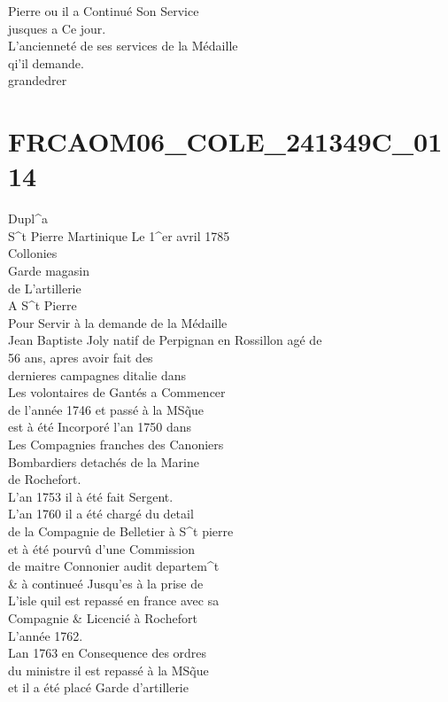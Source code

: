 \documentclass{article}
\begin{document}
\begin{pages}
Pierre ou il a Continué Son Service\\
jusques a Ce jour.\\
L'ancienneté de ses services de la Médaille\\
qi'il demande.\\
grandedrer
\pend
\endnumbering\beginnumbering\section{FRCAOM06\_COLE\_241349C\_0114}\pstart
Dupl\^{}a\\
S\^{}t Pierre Martinique Le 1\^{}er avril 1785\\
Collonies\\
Garde magasin\\
de L'artillerie\\
A S\^{}t Pierre\\
Pour Servir à la demande de la Médaille\\
Jean Baptiste Joly natif de
\pend\pstart
Perpignan en Rossillon agé de\\
56 ans, apres avoir fait des\\
dernieres campagnes ditalie dans\\
Les volontaires de Gantés a Commencer\\
de l'année 1746 et passé à la MSq̃ue\\
est à été Incorporé l'an 1750 dans\\
Les Compagnies franches des Canoniers\\
Bombardiers detachés de la Marine\\
de Rochefort.\\
L'an 1753 il à été fait Sergent.\\
L'an 1760 il a été chargé du detail\\
de la Compagnie de Belletier à S\^{}t pierre\\
et à été pourvû d'une Commission\\
de maitre Connonier audit departem\^{}t\\
\& à continueé Jusqu'es à la prise de\\
L'isle quil est repassé en france avec sa\\
Compagnie \& Licencié à Rochefort\\
L'année 1762.\\
Lan 1763 en Consequence des ordres\\
du ministre il est repassé à la MSq̃ue\\
et il a été placé Garde d'artillerie\\

\end{pages}
\end{document}
